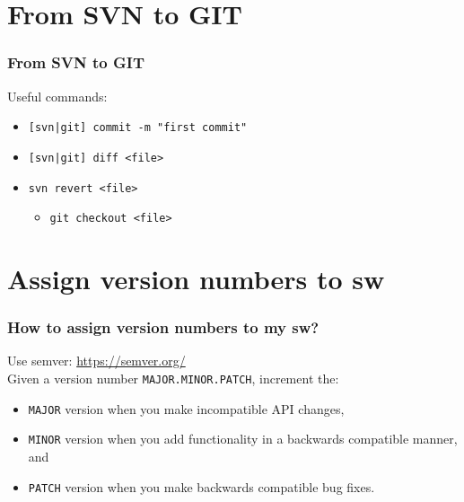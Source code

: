 \documentclass[pdf]{beamer}
\newcommand{\mono}[1]{\texttt{#1}}
\begin{document}
\section{From SVN to GIT}
\begin{frame}
  \frametitle{From SVN to GIT}
  Useful commands:
  \begin{itemize}
    \item \mono{[svn|git] commit -m "first commit"}
    \item \mono{[svn|git] diff <file>}
    
    \item \mono{svn revert <file>}
      \begin{itemize}
      \item \mono{git checkout <file>}
      \end{itemize}
  \end{itemize}
\end{frame}


\section{Assign version numbers to sw}
\begin{frame}
  \frametitle{How to assign version numbers to my sw?}
  Use semver: \url{https://semver.org/}\\
  Given a version number \mono{MAJOR.MINOR.PATCH}, increment the:
  \begin{itemize}
    \item \mono{MAJOR} version when you make incompatible API changes,
    \item \mono{MINOR} version when you add functionality in a backwards compatible manner, and
    \item \mono{PATCH} version when you make backwards compatible bug fixes.
  \end{itemize}
\end{frame}
\end{document}
